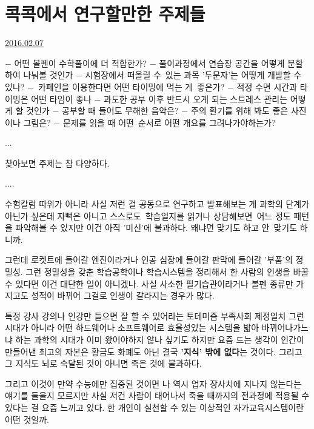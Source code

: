\section{콕콕에서 연구할만한 주제들}
\href{https://www.kockoc.com/Apoc/626685}{2016.02.07}

\vspace{5mm}

$-$ 어떤 볼펜이 수학풀이에 더 적합한가?
$-$ 풀이과정에서 연습장 공간을 어떻게 분할하여 나눠볼 것인가
$-$ 시험장에서 떠올릴 수 있는 과목 '두문자'는 어떻게 개발할 수 있나?
$-$ 카페인을 이용한다면 어떤 타이밍에 먹는 게 좋은가?
$-$ 적정 수면 시간과 타이밍은 어떤 타임이 좋나
$-$ 과도한 공부 이후 반드시 오게 되는 스트레스 관리는 어떻게 할 것인가
$-$ 공부할 때 들어도 무해한 음악은?
$-$ 주의 환기를 위해 봐도 좋은 사진이나 그림은?
$-$ 문제를 읽을 때 어떤 순서로 어떤 개요를 그려나가야하는가?
\vspace{5mm}

...
\vspace{5mm}

찾아보면 주제는 참 다양하다.
\vspace{5mm}

....
\vspace{5mm}

수험칼럼 따위가 아니라 사실 저런 걸 공동으로 연구하고 발표해보는 게 과학의 단계가 아닌가 싶은데
자뻑은 아니고 스스로도 학습일지를 읽거나 상담해보면 어느 정도 패턴을 파악해볼 수 있지만 이건 아직 '미신'에 불과하다.
왜냐면 맞기도 하고 안 맞기도 하니까.
\vspace{5mm}

그런데 로켓트에 들어갈 엔진이라거나 인공 심장에 들어갈 판막에 들어갈 '부품'의 정밀성.
그런 정밀성을 갖춘 학습공학이나 학습시스템을 정리해서 한 사람의 인생을 바꿀 수 있다면 이건 대단한 일이 아니겠나.
사실 사소한 필기습관이라거나 볼펜 종류만 가지고도 성적이 바뀌어 그걸로 인생이 갈라지는 경우가 많다.
\vspace{5mm}

특정 강사 강의나 인강만 들으면 잘 할 수 있어라는 토테미즘 부족사회 제정일치 그런 시대가 아니라
어떤 하드웨어나 소프트웨어로 효율성있는 시스템을 밟아 바뀌어나가느냐 하는 과학의 시대가 이미 왔어야하지 않나 싶기도 하지만
요즘 드는 생각이 인간이 만들어낸 최고의 자본은 황금도 화폐도 아닌 결국 \textbf{'지식' 밖에 없다}는 것이다.
그리고 그 지식도 뇌로 숙달된 것이 아니면 죽은 것에 불과하다.
\vspace{5mm}

그리고 이것이 만약 수능에만 집중된 것이면 나 역시 업자 장사치에 지나지 않는다는 얘기를 들을지 모르지만
사실 저건 사람이 태어나서 죽을 때까지의 전과정에 적용될 수 있다는 걸 요즘 느끼고 있다.
한 개인이 실천할 수 있는 이상적인 자가교육시스템이란 어떤 것일까.
\vspace{5mm}

